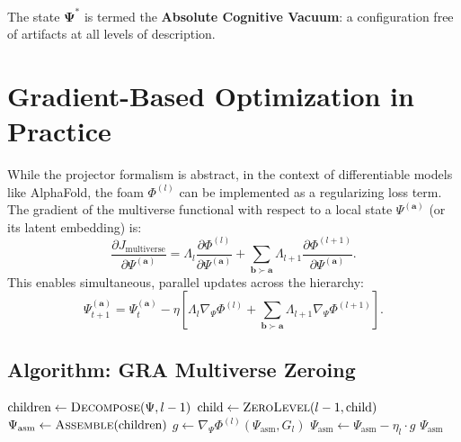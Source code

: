 \documentclass[11pt]{article}
\begin{document}
The state \(\mathbf{\Psi}^*\) is termed the \textbf{Absolute Cognitive Vacuum}: a configuration free of artifacts at all levels of description.

\section{Gradient-Based Optimization in Practice}

While the projector formalism is abstract, in the context of differentiable models like AlphaFold, the foam \(\Phi^{(l)}\) can be implemented as a regularizing loss term. The gradient of the multiverse functional with respect to a local state \(\Psi^{(\mathbf{a})}\) (or its latent embedding) is:
\begin{equation}
\frac{\partial J_{\text{multiverse}}}{\partial \Psi^{(\mathbf{a})}} = \Lambda_l \frac{\partial \Phi^{(l)}}{\partial \Psi^{(\mathbf{a})}} + \sum_{\mathbf{b} \succ \mathbf{a}} \Lambda_{l+1} \frac{\partial \Phi^{(l+1)}}{\partial \Psi^{(\mathbf{a})}}.
\end{equation}
This enables simultaneous, parallel updates across the hierarchy:
\begin{equation}
\Psi^{(\mathbf{a})}_{t+1} = \Psi^{(\mathbf{a})}_{t} - \eta \left[ \Lambda_l \nabla_{\Psi} \Phi^{(l)} + \sum_{\mathbf{b} \succ \mathbf{a}} \Lambda_{l+1} \nabla_{\Psi} \Phi^{(l+1)} \right].
\end{equation}

\subsection{Algorithm: GRA Multiverse Zeroing}
\begin{algorithm}[H]
\caption{Recursive Meta-Zeroing for Protein Multiverse}
\begin{algorithmic}[1]
        \State \Return {}
    \Else
        \State $\text{children} \gets \Call{Decompose}{\Psi, l-1}$
            \State $\text{child} \gets \Call{ZeroLevel}{l-1, \text{child}}$
        \EndFor
        \State $\Psi_{\text{asm}} \gets \Call{Assemble}{\text{children}}$
            \State $g \gets \nabla_{\Psi} \Phi^{(l)}(\Psi_{\text{asm}}, G_l)$
            \State $\Psi_{\text{asm}} \gets \Psi_{\text{asm}} - \eta_l \cdot g$
        \EndWhile
        \State \Return $\Psi_{\text{asm}}$
    \EndIf
\EndFunction
\end{algorithmic}
\end{algorithm}
\end{document}
